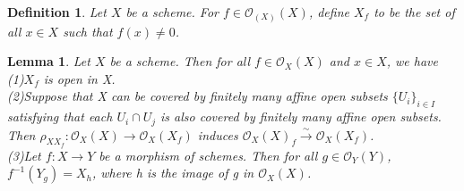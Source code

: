 \documentclass{ctexart}
\newtheorem{definition}{Definition}[section]
\newtheorem{lemma}{Lemma}[section]
\begin{document}
\begin{definition}
    Let $X$ be a scheme.
    For $f\in \mathcal{O}_(X)(X)$, define $X_{f}$ to be the set of all $x\in X$ such that $f(x)\neq 0$.
\end{definition}
\begin{lemma}
    Let $X$ be a scheme.
    Then for all $f\in \mathcal{O}_{X}(X)$ and $x\in X$, we have \\
    (1)$X_{f}$ is open in X. \\
    (2)Suppose that X can be covered by finitely many affine open subsets $\{U_{i}\}_{i\in I}$ satisfying that each $U_{i} \cap U_{j}$ is also covered by finitely many affine open subsets.
    Then $\rho_{XX_{f}}: \mathcal{O}_{X}(X) \longrightarrow \mathcal{O}_{X}(X_{f})$ induces $\mathcal{O}_{X}(X)_{f} \overset{\sim}{\longrightarrow} \mathcal{O}_{X}(X_{f})$. \\
    (3)Let $f: X \longrightarrow Y$ be a morphism of schemes. 
    Then for all $g\in \mathcal{O}_{Y}(Y)$, $f^{-1}(Y_{g}) = X_{h}$, where h is the image of g in $\mathcal{O}_{X}(X)$.
    \label{Lemma 2.6}
\end{lemma}
\end{document}
